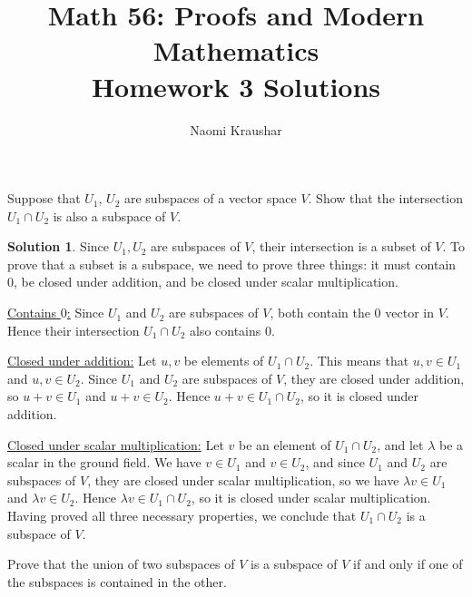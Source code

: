 \documentclass[12pt]{article}
\theoremstyle{definition}
\theoremstyle{definition}
\newtheorem*{soln}{Solution}
\begin{document}
\title{Math 56: Proofs and Modern Mathematics\\ Homework 3 Solutions}
\author{Naomi Kraushar}
\maketitle



\begin{prob}[Cf. Axler 1.C.10.]
Suppose that $U_1$, $U_2$ are subspaces of a vector space $V$. Show that the intersection $U_1\cap U_2$ is also a subspace of $V$.
\end{prob}

\begin{soln}
Since $U_1,U_2$ are subspaces of $V$, their intersection is a subset of $V$. To prove that a subset is a subspace, we need to prove three things: it must contain $0$, be closed under addition, and be closed under scalar multiplication.

\underline{Contains $0$:} Since $U_1$ and $U_2$ are subspaces of $V$, both contain the $0$ vector in $V$. Hence their intersection $U_1\cap U_2$ also contains $0$.

\underline{Closed under addition:} Let $u,v$ be elements of $U_1\cap U_2$. This means that $u,v\in U_1$ and $u,v\in U_2$. Since $U_1$ and $U_2$ are subspaces of $V$, they are closed under addition, so $u+v\in U_1$ and $u+v\in U_2$. Hence $u+v\in U_1\cap U_2$, so it is closed under addition.

\underline{Closed under scalar multiplication:} Let $v$ be an element of $U_1\cap U_2$, and let $\lambda$ be a scalar in the ground field. We have $v\in U_1$ and $v\in U_2$, and since $U_1$ and $U_2$ are subspaces of $V$, they are closed under scalar multiplication, so we have $\lambda v\in U_1$ and $\lambda v\in U_2$. Hence $\lambda v\in U_1\cap U_2$, so it is closed under scalar multiplication.
Having proved all three necessary properties, we conclude that $U_1\cap U_2$ is a subspace of $V$.
\end{soln}

\begin{prob}[Cf. Axler 1.C.12.]
Prove that the union of two subspaces of $V$ is a subspace of $V$ if and only if one of the subspaces is contained in the other.
\end{prob}
\end{document}
